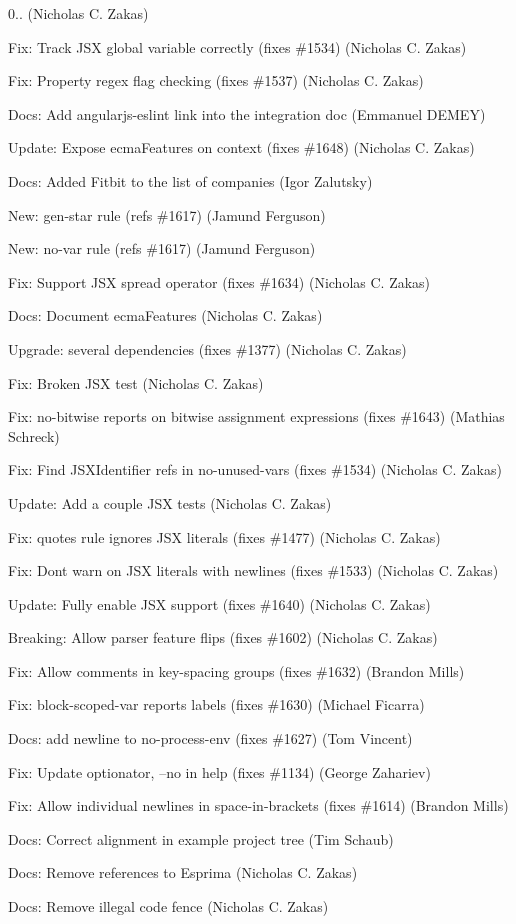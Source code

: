 \begin{DoxyItemize}
\item 0.. (Nicholas C. Zakas)
\item Fix\+: Track J\+SX global variable correctly (fixes \#1534) (Nicholas C. Zakas)
\item Fix\+: Property regex flag checking (fixes \#1537) (Nicholas C. Zakas)
\item Docs\+: Add angularjs-\/eslint link into the integration doc (Emmanuel D\+E\+M\+EY)
\item Update\+: Expose ecma\+Features on context (fixes \#1648) (Nicholas C. Zakas)
\item Docs\+: Added Fitbit to the list of companies (Igor Zalutsky)
\item New\+: gen-\/star rule (refs \#1617) (Jamund Ferguson)
\item New\+: no-\/var rule (refs \#1617) (Jamund Ferguson)
\item Fix\+: Support J\+SX spread operator (fixes \#1634) (Nicholas C. Zakas)
\item Docs\+: Document ecma\+Features (Nicholas C. Zakas)
\item Upgrade\+: several dependencies (fixes \#1377) (Nicholas C. Zakas)
\item Fix\+: Broken J\+SX test (Nicholas C. Zakas)
\item Fix\+: no-\/bitwise reports on bitwise assignment expressions (fixes \#1643) (Mathias Schreck)
\item Fix\+: Find J\+S\+X\+Identifier refs in no-\/unused-\/vars (fixes \#1534) (Nicholas C. Zakas)
\item Update\+: Add a couple J\+SX tests (Nicholas C. Zakas)
\item Fix\+: quotes rule ignores J\+SX literals (fixes \#1477) (Nicholas C. Zakas)
\item Fix\+: Don\textquotesingle{}t warn on J\+SX literals with newlines (fixes \#1533) (Nicholas C. Zakas)
\item Update\+: Fully enable J\+SX support (fixes \#1640) (Nicholas C. Zakas)
\item Breaking\+: Allow parser feature flips (fixes \#1602) (Nicholas C. Zakas)
\item Fix\+: Allow comments in key-\/spacing groups (fixes \#1632) (Brandon Mills)
\item Fix\+: block-\/scoped-\/var reports labels (fixes \#1630) (Michael Ficarra)
\item Docs\+: add newline to no-\/process-\/env (fixes \#1627) (Tom Vincent)
\item Fix\+: Update optionator, --no in help (fixes \#1134) (George Zahariev)
\item Fix\+: Allow individual newlines in space-\/in-\/brackets (fixes \#1614) (Brandon Mills)
\item Docs\+: Correct alignment in example project tree (Tim Schaub)
\item Docs\+: Remove references to Esprima (Nicholas C. Zakas)
\item Docs\+: Remove illegal code fence (Nicholas C. Zakas)
\end{DoxyItemize}

